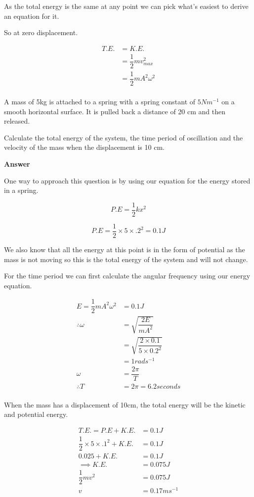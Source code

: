 \documentclass[revision-guide.tex]{subfiles}
\begin{document}
As the total energy is the same at any point we can pick what's easiest to derive an equation for it.

So at zero displacement.

\begin{align*}
T.E. &= K.E. \\
&= \dfrac{1}{2}mv_{max}^2 \\
&= \dfrac{1}{2}mA^2\omega^2 \\
\end{align*}


\begin{example}

A mass of 5kg is attached to a spring with a spring constant of $5 Nm^{-1}$ on a smooth horizontal surface.
It is pulled back a distance of 20 cm and then released.

Calculate the total energy of the system, the time period of oscillation and the velocity of the mass when the displacement is 10 cm.





\textbf{Answer}

One way to approach this question is by using our equation for the energy stored in a spring.

\[
P.E = \dfrac{1}{2}kx^2
\]

\[
P.E = \dfrac{1}{2} \times 5 \times .2^2 = 0.1J
\]

We also know that all the energy at this point is in the form of potential as the mass is not moving so this is the total energy of the system and will not change.

For the time period we can first calculate the angular frequency using our energy equation.

\begin{align*}
E = \dfrac{1}{2}mA^2\omega^2 &= 0.1 J\\
\therefore \omega &= \sqrt{\dfrac{2 E}{m A^2}}\\
&= \sqrt{\dfrac{2 \times 0.1}{5 \times 0.2^2}}\\
&= 1 rads^{-1}\\
\omega &= \dfrac{2 \pi}{T} \\
\therefore T &= 2 \pi = 6.2 seconds \\
\end{align*}


When the mass has a displacement of 10cm, the total energy will be the kinetic and potential energy.


\begin{align*}
T.E. = P.E + K.E. &= 0.1J \\
 \dfrac{1}{2} \times 5 \times .1^2 + K.E. &= 0.1J\\
 0.025 + K.E. &= 0.1J  \\
 \implies K.E. &= 0.075J \\
 \dfrac{1}{2}mv^2 &= 0.075J \\
 v &= 0.17 ms^{-1} \\
 \end{align*}

\end{example}
\end{document}
